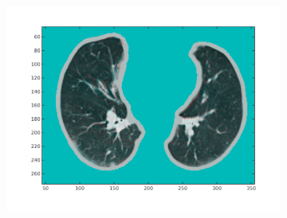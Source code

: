 \documentclass[11pt,a4paper,oneside]{report}
\begin{document}
\begin{figure}
\begin{subfigure}[b]{0.3\textwidth}
  \end{subfigure}
  \begin{subfigure}[b]{0.3\textwidth}
	  \includegraphics[width=\textwidth, trim=20 20 20 20]{figures/reg1/reg3_2_49.png}
  \end{subfigure}
  


\end{figure}
\end{document}
